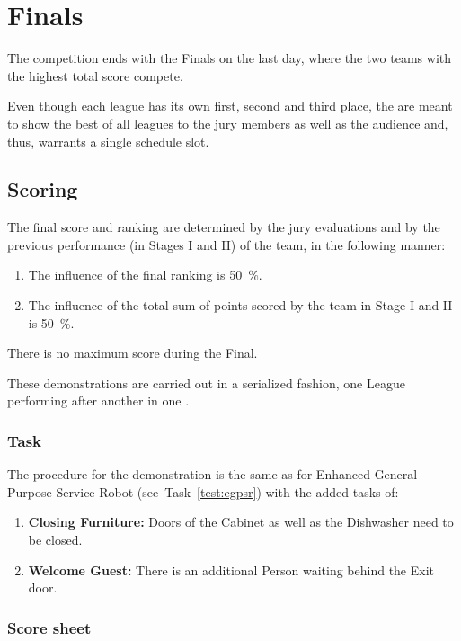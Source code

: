 \chapter{Finals}

The competition ends with the Finals on the last day, where the two teams with the highest total score compete.

Even though each league has its own first, second and third place, the  are meant to show the best of all leagues to the jury members as well as the audience and, thus, warrants a single schedule slot.

\section{Scoring}
The final score and ranking are determined by the jury evaluations and by the previous performance (in Stages I and II) of the team, in the following manner:

\begin{enumerate}
  \item The influence of the final ranking is \SI{50}{\percent}.
  \item The influence of the total sum of points scored by the team in Stage I and II is \SI{50}{\percent}.
\end{enumerate}

There is no maximum score during the Final.

These demonstrations are carried out in a serialized fashion, one League performing after another in one \Arena{}.

\subsection{Task}
The procedure for the demonstration is the same as for Enhanced General Purpose Service Robot (see~Task~\ref{test:egpsr}) with the added tasks of:

\begin{enumerate}[nosep]
\item \textbf{Closing Furniture:} Doors of the Cabinet as well as the Dishwasher need to be closed.
\item \textbf{Welcome Guest:} There is an additional Person waiting behind the Exit door.
\end{enumerate}

\subsection*{Score sheet}


